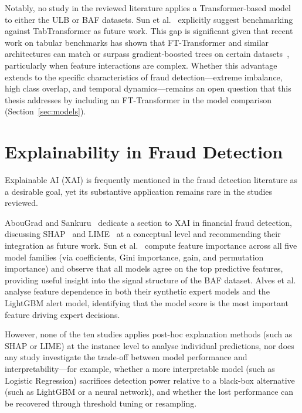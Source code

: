 Notably, no study in the reviewed literature applies a Transformer-based model to either the ULB or BAF datasets. Sun et al.~\cite{sun2025objective} explicitly suggest benchmarking against TabTransformer as future work. This gap is significant given that recent work on tabular benchmarks has shown that FT-Transformer and similar architectures can match or surpass gradient-boosted trees on certain datasets~\cite{gorishniy2021revisiting}, particularly when feature interactions are complex. Whether this advantage extends to the specific characteristics of fraud detection---extreme imbalance, high class overlap, and temporal dynamics---remains an open question that this thesis addresses by including an FT-Transformer in the model comparison (Section~\ref{sec:models}).


\section{Explainability in Fraud Detection}
\label{sec:rw_xai}

Explainable AI (XAI) is frequently mentioned in the fraud detection literature as a desirable goal, yet its substantive application remains rare in the studies reviewed.

AbouGrad and Sankuru~\cite{abougrad2025online} dedicate a section to XAI in financial fraud detection, discussing SHAP~\cite{lundberg2017unified} and LIME~\cite{ribeiro2016why} at a conceptual level and recommending their integration as future work. Sun et al.~\cite{sun2025objective} compute feature importance across all five model families (via coefficients, Gini importance, gain, and permutation importance) and observe that all models agree on the top predictive features, providing useful insight into the signal structure of the BAF dataset. Alves et al.~\cite{alves2025benchmarking} analyse feature dependence in both their synthetic expert models and the LightGBM alert model, identifying that the model score is the most important feature driving expert decisions.

However, none of the ten studies applies post-hoc explanation methods (such as SHAP or LIME) at the instance level to analyse individual predictions, nor does any study investigate the trade-off between model performance and interpretability---for example, whether a more interpretable model (such as Logistic Regression) sacrifices detection power relative to a black-box alternative (such as LightGBM or a neural network), and whether the lost performance can be recovered through threshold tuning or resampling.

